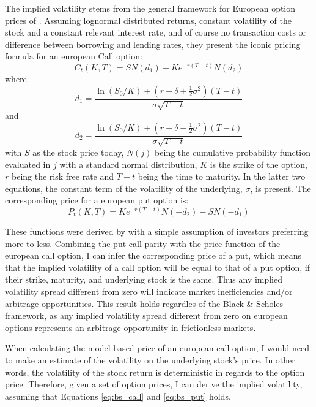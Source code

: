 The implied volatility stems from the general framework for European option prices of \cite{black1973pricing}. Assuming lognormal distributed returns, constant volatility of the stock and a constant relevant interest rate, and of course no transaction costs or difference between borrowing and lending rates, they present the iconic pricing formula for an european Call option:
\begin{equation}
	C_{t}(K,T)=SN\left(d_{1}\right)-Ke^{-r\left(T-t\right)}N\left(d_{2}\right)
	\label{eq:bs_call}
\end{equation}
where $$d_{1}=\frac{\ln\left(S_{0}/K\right)+\left(r-\delta+\frac{1}{2}\sigma^{2}\right)\left(T-t\right)}{\sigma\sqrt{T-t}}$$
and 
$$d_{2}=\frac{\ln\left(S_{0}/K\right)+\left(r-\delta-\frac{1}{2}\sigma^{2}\right)\left(T-t\right)}{\sigma\sqrt{T-t}}$$
with $S$ as the stock price today, $N\left(j\right)$ being the cumulative probability function evaluated in $j$ with a standard normal distribution, $K$ is the strike of the option, $r$ being the risk free rate and $T-t$ being the time to maturity. In the latter two equations, the constant term of the volatility of the underlying, $\sigma$, is present. The corresponding price for a european put option is:
\begin{equation}
	P_{t}(K,T)=Ke^{-r\left(T-t\right)}N\left(-d_{2}\right)-SN\left(-d_{1}\right)
	\label{eq:bs_put}
\end{equation}

These functions were derived by \cite{merton1973theory} with a simple assumption of investors preferring more to less. Combining the put-call parity with the price function of the european call option, I can infer the corresponding price of a put, which means that the implied volatility of a call option will be equal to that of a put option, if their strike, maturity, and underlying stock is the same. Thus any implied volatility spread different from zero will indicate market inefficiencies and/or arbitrage opportunities. This result holds regardles of the Black \& Scholes framework, as any implied volatility spread different from zero on european options represents an arbitrage opportunity in frictionless markets. 

When calculating the model-based price of an european call option, I would need to make an estimate of the volatility on the underlying stock's price. In other words, the volatility of the stock return is deterministic in regards to the option price. Therefore, given a set of option prices, I can derive the implied volatility, assuming that Equations \ref{eq:bs_call} and \ref{eq:bs_put} holds. 

